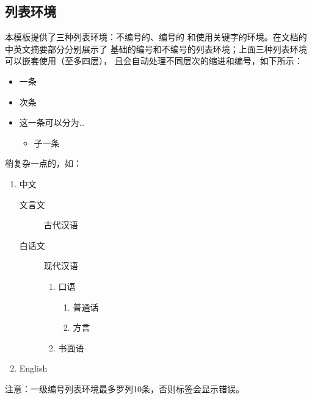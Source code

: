 \subsection{列表环境}\label{subsec:items}
本模板提供了三种列表环境：不编号的、编号的
和使用关键字的环境。在文档的中英文摘要部分分别展示了
基础的编号和不编号的列表环境；上面三种列表环境可以嵌套使用（至多四层），
且会自动处理不同层次的缩进和编号，如下所示：
\begin{itemize}
	\item 一条
	\item 次条
	\item 这一条可以分为\dots
			\begin{itemize}
				\item 子一条
			\end{itemize}
\end{itemize}
稍复杂一点的，如：
\begin{enumerate}
	\item 中文
		\begin{description}
			\item[文言文] 古代汉语
			\item[白话文] 现代汉语
				\begin{enumerate}
					\item 口语
						\begin{enumerate}
							\item 普通话
							\item 方言
						\end{enumerate}
					\item 书面语
				\end{enumerate}
		\end{description}
	\item English
\end{enumerate}

注意：一级编号列表环境最多罗列10条，否则标签会显示错误。%
